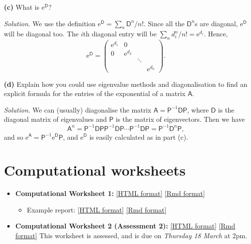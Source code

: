 \documentclass[
  a4paper,
]{article}
\providecommand{\tightlist}{%
  \setlength{\itemsep}{0pt}\setlength{\parskip}{0pt}}
\theoremstyle{definition}
\theoremstyle{definition}
\theoremstyle{definition}
\theoremstyle{remark}
\begin{document}
\textbf{(c)} What is \(\mathrm{e}^{\mathsf D}\)?

\begin{myanswers}
\emph{Solution.}
We use the definition \(\mathrm{e}^{\mathsf D} = \sum_n \mathsf D^n / n!\). Since all the \(\mathsf D^n\)s are diagonal, \(\mathrm{e}^{\mathsf D}\) will be diagonal too. The \(i\)th diagonal entry will be \(\sum_n d_i^n / n! = \mathrm{e}^{d_i}\). Hence,
\[ \mathrm{e}^{\mathsf D}  = \begin{pmatrix} \mathrm{e}^{d_1} & 0 & &  \\
0 & \mathrm{e}^{d_2} & &  \\
&  & \ddots & \\
&  & & \mathrm{e}^{d_n} \end{pmatrix} .\]

\end{myanswers}

\textbf{(d)} Explain how you could use eigenvalue methods and diagonalisation to find an explicit formula for the entries of the exponential of a matrix \(\mathsf A\).

\begin{myanswers}
\emph{Solution.}
We can (usually) diagonalise the matrix \(\mathsf A = \mathsf P^{-1}\mathsf{DP}\), where \(\mathsf D\) is the diagonal matrix of eigenvalues and \(\mathsf P\) is the matrix of eigenvectors. Then we have
\[ \mathsf A^n = \mathsf P^{-1}\mathsf{DP}\mathsf P^{-1}\mathsf{DP}\cdots\mathsf P^{-1}\mathsf{DP} = \mathsf P^{-1}\mathsf{D}^n\mathsf{P} ,  \]
and so \(\mathrm{e}^{\mathsf A} = \mathsf P^{-1} \mathrm{e}^{\mathsf D} \mathsf P\), and \(\mathrm{e}^{\mathsf D}\) is easily calculated as in part (c).

\end{myanswers}

\hypertarget{computing}{%
\section*{Computational worksheets}\label{computing}}

\begin{itemize}
\tightlist
\item
  \textbf{Computational Worksheet 1:} \href{computing/C1.html}{{[}HTML format{]}} \href{computing/C1.Rmd}{{[}Rmd format{]}}

  \begin{itemize}
  \tightlist
  \item
    Example report: \href{computing/C1-example.html}{{[}HTML format{]}} \href{computing/C1-example.Rmd}{{[}Rmd format{]}}
  \end{itemize}
\item
  \textbf{Computational Worksheet 2 (Assessment 2):} \href{computing/C2.html}{{[}HTML format{]}} \href{computing/C2.Rmd}{{[}Rmd format{]}} This worksheet is assessed, and is due on \emph{Thursday 18 March} at 2pm.
\end{itemize}
\end{document}
